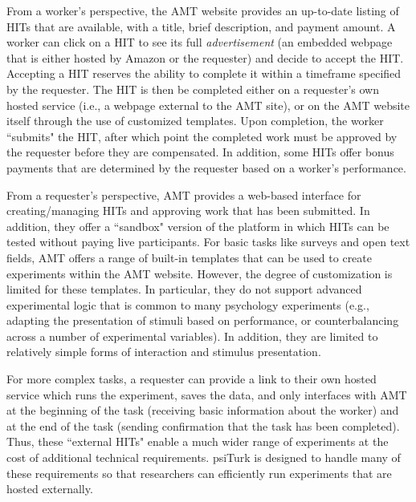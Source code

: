 \documentclass[twocolumn]{svjour3}          %
\begin{document}
From a worker's perspective, the AMT website provides an up-to-date listing of HITs that are available, with a title, brief description, and payment amount.
A worker can click on a HIT to see its full \emph{advertisement} (an embedded webpage that is either hosted by
Amazon or the requester) and decide to accept the HIT. 
Accepting a HIT reserves the ability to complete it within a timeframe specified by the requester.
The HIT is then be completed either on a requester's own hosted service (i.e., a webpage external to the AMT site), or on the AMT website itself through the use of customized templates.
Upon completion, the worker ``submits" the HIT, after which point the completed work must be approved by the requester before they are compensated.
In addition, some HITs offer bonus payments that are determined by the requester based on a worker's performance.

From a requester's perspective, AMT provides a web-based interface for creating/managing HITs and approving work that has been submitted.
In addition, they offer a ``sandbox" version of the platform in which HITs can be tested without paying live participants.
For basic tasks like surveys and open text fields, AMT offers a range of built-in templates that can be used to create experiments within the AMT website.
However, the degree of customization is limited for these templates. 
In particular, they do not support advanced experimental logic that is common to many psychology experiments (e.g., adapting the presentation of stimuli based on performance, or counterbalancing across a number of experimental variables).
In addition, they are limited to relatively simple forms of interaction and stimulus presentation.

For more complex tasks, a requester can provide a link to their own hosted service which runs the experiment, saves the data, and only interfaces with AMT at the beginning of the task (receiving basic information about the worker) and at the end of the task (sending confirmation that the task has been completed).
Thus, these ``external HITs" enable a much wider range of experiments at the cost of additional technical requirements.
psiTurk is designed to handle many of these requirements so that researchers can efficiently run experiments that are hosted externally.
\end{document}
